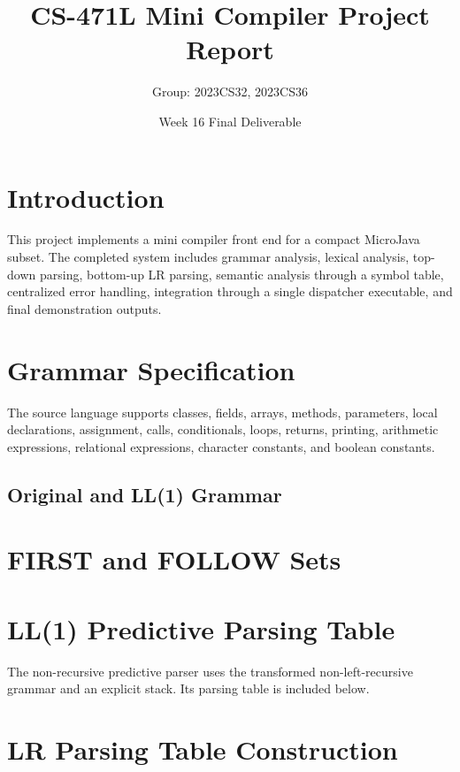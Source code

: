 \documentclass[12pt,a4paper]{article}
\title{CS-471L Mini Compiler Project Report}
\author{Group: 2023CS32, 2023CS36}
\date{Week 16 Final Deliverable}
\begin{document}
\maketitle

\section{Introduction}

This project implements a mini compiler front end for a compact MicroJava subset. The completed system includes grammar analysis, lexical analysis, top-down parsing, bottom-up LR parsing, semantic analysis through a symbol table, centralized error handling, integration through a single dispatcher executable, and final demonstration outputs.

\section{Grammar Specification}

The source language supports classes, fields, arrays, methods, parameters, local declarations, assignment, calls, conditionals, loops, returns, printing, arithmetic expressions, relational expressions, character constants, and boolean constants.

\subsection{Original and LL(1) Grammar}


\section{FIRST and FOLLOW Sets}



\section{LL(1) Predictive Parsing Table}

The non-recursive predictive parser uses the transformed non-left-recursive grammar and an explicit stack. Its parsing table is included below.



\section{LR Parsing Table Construction}
\end{document}
